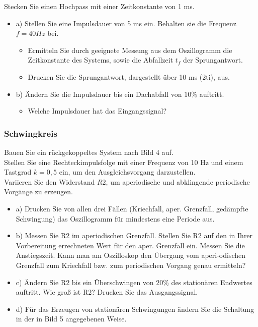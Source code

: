 Stecken Sie einen Hochpass mit einer Zeitkonstante von 1 ms.\\
\begin{itemize}
	\item a) Stellen Sie eine Impulsdauer von 5 ms ein. Behalten sie die Frequenz $f =40 Hz$ bei.
\begin{itemize}
\item Ermitteln Sie durch geeignete Messung aus dem Oszillogramm die Zeitkonstante des Systems, sowie die Abfallzeit $t_{f}$ der Sprungantwort. 
\item Drucken Sie die Sprungantwort, dargestellt über 10 ms (2ti), aus. 
\end{itemize}
\end{itemize}
\begin{itemize}
	\item b) Ändern Sie die Impulsdauer bis ein Dachabfall von $10\%$ auftritt.\\
\begin{itemize}
	\item Welche Impulsdauer hat das Eingangssignal?	
\end{itemize}
\end{itemize}

\subsubsection{Schwingkreis}

Bauen Sie ein rückgekoppeltes System nach Bild 4 auf.\\
Stellen Sie eine Rechteckimpulsfolge mit einer Frequenz von 10 Hz und einem Tastgrad $k = 0,5$ ein, um den Ausgleichsvorgang darzustellen.\\ 
Variieren Sie den Widerstand $R2$, um aperiodische und abklingende periodische Vorgänge zu erzeugen.\\
\begin{itemize}
\item 	a) Drucken Sie von allen drei Fällen (Kriechfall, aper. Grenzfall, gedämpfte Schwingung) das Oszillogramm für mindestens eine Periode aus. 
\item	b) Messen Sie R2 im aperiodischen Grenzfall. Stellen Sie R2 auf den in Ihrer Vorbereitung errechneten Wert für den aper. Grenzfall ein.
Messen Sie die Anstiegszeit. Kann man am Oszilloskop den Übergang vom aperi-odischen Grenzfall zum Kriechfall bzw. zum periodischen 
Vorgang genau ermitteln? 
\item 	c) Ändern Sie R2 bis ein Überschwingen von 20\% des stationären Endwertes auftritt. 
Wie groß ist R2? Drucken Sie das Ausgangssignal. 
\item	d) Für das Erzeugen von stationären Schwingungen ändern Sie die Schaltung in der in Bild 5 angegebenen Weise. 
\end{itemize}

